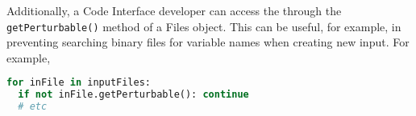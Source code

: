 Additionally, a Code Interface developer can access the  through the \texttt{getPerturbable()} method of a Files object.  This can be useful, for example, in preventing searching binary files for variable names when creating new input. For example,
\begin{lstlisting}[language=python]
for inFile in inputFiles:
  if not inFile.getPerturbable(): continue
  # etc
\end{lstlisting}
